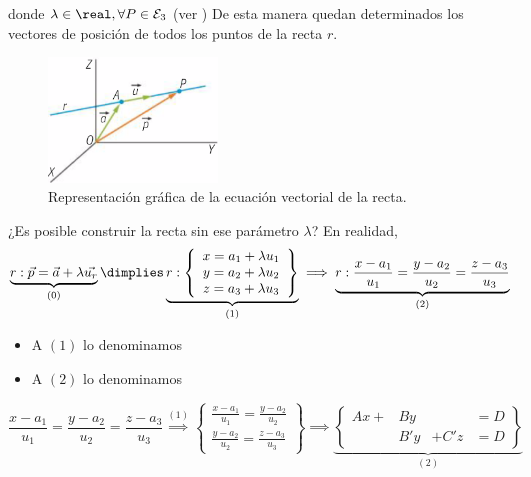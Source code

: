 donde $\lambda\in\real, \forall P\in\mathcal{E}_3$ (ver )
%
De esta manera quedan determinados los vectores de posición de todos los puntos de la recta $r$.


\begin{figure}[hptb]
    \centering
    \includegraphics[width=0.4\textwidth]{img/EcVectorialRecta.png}
    \caption{Representación gráfica de la ecuación vectorial de la recta.}
    \label{fig::recta_ecuacion_vectorial}
\end{figure}


¿Es posible construir la recta sin ese parámetro $\lambda$? En realidad,
$$\underbrace{r : \vec{p} = \vec{a} + \lambda \vec{u_r}}_{(0)}\dimplies \underbrace{r:\displaystyle \left\{
\begin{array}{c} 
  x = a_1 + \lambda u_1\\
  y = a_2 + \lambda u_2 \\ 
  z = a_3 + \lambda u_3
\end{array}\right\}}_{(1)} \implies \underbrace{r:\frac{x-a_1}{u_1} = \frac{y-a_2}{u_2} = \frac{z-a_3}{u_3}}_{(2)}$$

\begin{itemize}
    \item A $(1)$ lo denominamos 
    \item A $(2)$ lo denominamos 
\end{itemize}

\[
\frac{x-a_1}{u_1} = \frac{y-a_2}{u_2} = \frac{z-a_3}{u_3}\overset{(1)}{\implies} \left\{
\begin{array}{c}
     \displaystyle\frac{x-a_1}{u_1} = \frac{y-a_2}{u_2}\\
     \displaystyle\frac{y-a_2}{u_2} = \frac{z-a_3}{u_3}
\end{array}\right\} \implies
\underbrace{\left\{\begin{array}{cccc}
     Ax + &By    &     & = D\\
          &B'y   &+ C'z  & = D
\end{array}\right\}}_{(2)}
\]



